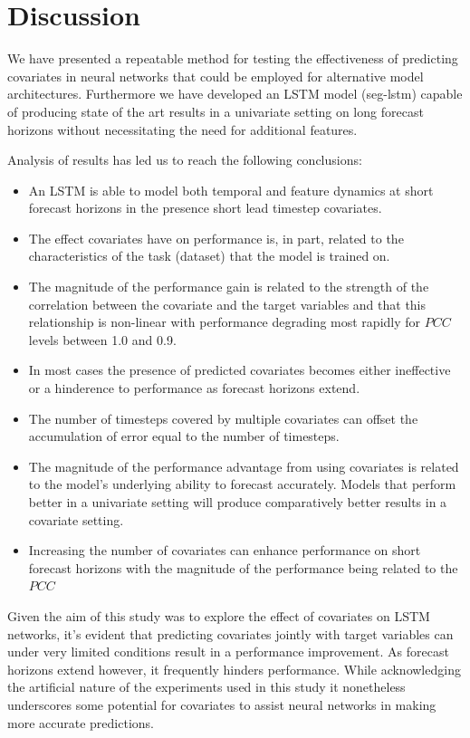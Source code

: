 \documentclass[letterpaper]{article}
\newcommand{\pearson}{PCC}
\begin{document}
\section{Discussion}
We have presented a repeatable method for testing the effectiveness of predicting covariates in neural networks that could be employed for alternative 
model architectures. Furthermore we have developed an LSTM model (seg-lstm) capable of producing state of the art results in a univariate setting on 
long forecast horizons without necessitating the need for additional features. 

Analysis of results has led us to reach the following conclusions:
\begin{itemize}
\item An LSTM is able to model both temporal and feature dynamics at short forecast horizons in the presence short lead timestep covariates.
\item The effect covariates have on performance is, in part, related to the characteristics of the task (dataset) that the model is trained on.
\item The magnitude of the performance gain is related to the strength of the correlation between the covariate and the target variables and that this relationship 
is non-linear with performance degrading most rapidly for $\pearson$ levels between 1.0 and 0.9. 
\item In most cases the presence of predicted covariates becomes either ineffective or a hinderence to performance as forecast horizons extend.
\item The number of timesteps covered by multiple covariates can offset the accumulation of error equal to the number of timesteps. 
\item The magnitude of the performance advantage from using covariates is related to the model's underlying ability to forecast accurately. 
Models that perform better in a univariate setting will produce comparatively better results in a 
covariate setting.
\item Increasing the number of covariates can enhance performance on short forecast horizons with the magnitude of the performance being related to the $\pearson$
\end{itemize}

Given the aim of this study was to explore the effect of covariates on LSTM networks, it's evident that predicting covariates 
jointly with target variables can under very limited conditions result in a performance improvement. As forecast horizons extend however, it frequently 
hinders performance. While acknowledging the artificial nature of the experiments used in this study
it nonetheless underscores some potential for covariates to assist neural networks in making more accurate predictions. 
\end{document}
